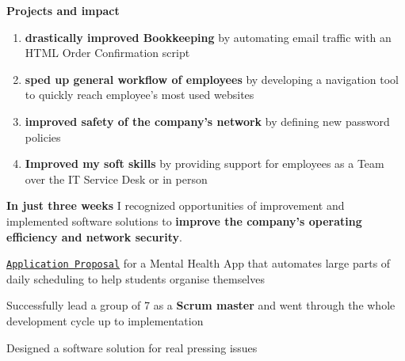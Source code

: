 \documentclass[]{jonas-cv}
\begin{document}
\begin{minipage}[t]{0.63\textwidth} 


\tinysectionsep
{}
\sectionsep

\begin{tightemize}
    \item \textbf{Projects and impact}
    \begin{enumerate}
        \item \textbf{drastically improved Bookkeeping} by automating email traffic with an HTML Order Confirmation script
        \item \textbf{sped up general workflow of employees} by developing a navigation tool to quickly reach employee's most used websites
        \item \textbf{improved safety of the company's network} by defining new password policies
        \item \textbf{Improved my soft skills} by providing support for employees as a Team over the IT Service Desk or in person
    \end{enumerate}
    \vspace{1mm}

    \item [\faicon{angle-double-right}] \textbf{In just three weeks} I recognized opportunities of improvement and implemented software solutions
    to \textbf{improve the company's operating efficiency and network security}.
\end{tightemize}
\largesectionsep


\tinysectionsep

\begin{tightemize}
    \item \href{https://github.com/j0ner0n/mobile-scheduling-app/blob/master/final-doc/software-engineering-g21.pdf}{\texttt{Application Proposal}} for a Mental Health App that automates large parts of daily scheduling to help students organise themselves
    \item[\faicon{angle-double-right}] Successfully lead a group of 7 as a \textbf{Scrum master} and went through the whole development cycle up to implementation
    \item[\faicon{angle-double-right}] Designed a software solution for real pressing issues 
\end{tightemize}
\largesectionsep



\end{minipage}
\end{document}
